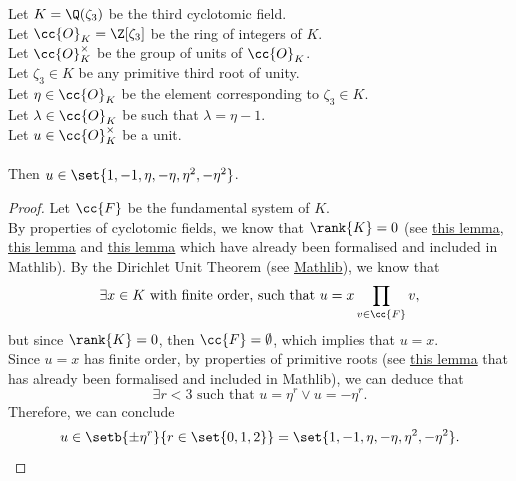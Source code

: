 \begin{theorem}
    \label{thm:mem}
    \leanok
    Let $K = \Q(\zeta_3)$ be the third cyclotomic field. \\
    Let $\cc{O}_K = \Z[\zeta_3]$ be the ring of integers of $K$. \\
    Let $\cc{O}^\times_K$ be the group of units of $\cc{O}_K$. \\
    Let $\zeta_3 \in K$ be any primitive third root of unity. \\
    Let $\eta \in \cc{O}_K$ be the element corresponding to $\zeta_3 \in K$. \\
    Let $\lambda \in \cc{O}_K$ be such that $\lambda = \eta -1$. \\
    Let $u \in \cc{O}^\times_K$ be a unit. \\\\
    Then $u \in \set{1, -1, \eta, -\eta, \eta^2, -\eta^2}$.
\end{theorem}
\begin{proof}
    \leanok
    Let $\cc{F}$ be the fundamental system of $K$. \\
    By properties of cyclotomic fields, we know that $\rank{K} = 0$
    (see \href{https://pitmonticone.github.io/FLT3/docs/Mathlib/NumberTheory/NumberField/Embeddings.html#NumberField.InfinitePlace.card_eq_nrRealPlaces_add_nrComplexPlaces}{this lemma},
    \href{https://pitmonticone.github.io/FLT3/docs/FLT3/Mathlib/NumberTheory/Cyclotomic/Embeddings.html#IsCyclotomicExtension.Rat.nrRealPlaces_eq_zero}{this lemma}
    and \href{https://pitmonticone.github.io/FLT3/docs/FLT3/Mathlib/NumberTheory/Cyclotomic/Embeddings.html#IsCyclotomicExtension.Rat.nrComplexPlaces_eq_totient_div_two}{this lemma}
    which have already been formalised and included in Mathlib).
    By the Dirichlet Unit Theorem (see \href{https://pitmonticone.github.io/FLT3/docs/Mathlib/NumberTheory/NumberField/Units.html#NumberField.Units.exist_unique_eq_mul_prod}{Mathlib}),
    we know that
    $$\exists x \in K \text{ with finite order, such that } u = x \prod_{v\in\cc{F}} v,$$
    but since $\rank{K} = 0$, then $\cc{F} = \emptyset$, which implies that $u = x$.\\
    Since $u = x$ has finite order, by properties of primitive roots
    (see \href{https://pitmonticone.github.io/FLT3/docs/Mathlib/NumberTheory/Cyclotomic/PrimitiveRoots.html#IsPrimitiveRoot.exists_pow_or_neg_mul_pow_of_isOfFinOrder}{this lemma}
    that has already been formalised and included in Mathlib), we can deduce that
    $$\exists r < 3 \text{ such that } u = \eta^r \lor u = -\eta^r.$$
    Therefore, we can conclude
    $$u \in \setb{\pm \eta^r}{r \in \set{0,1,2}} = \set{1, -1, \eta, -\eta, \eta^2, -\eta^2}.$$
\end{proof}

